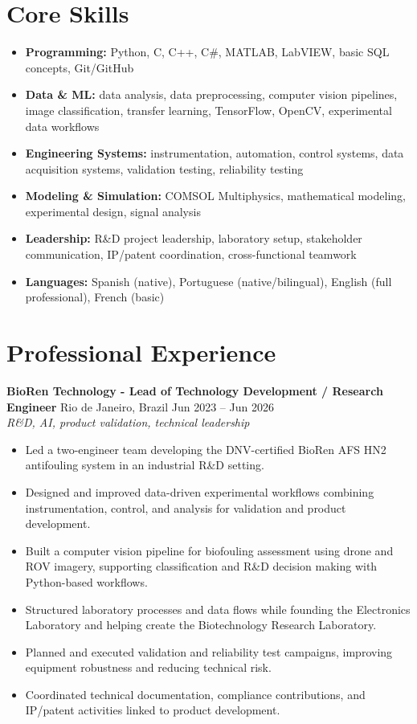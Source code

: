 \documentclass[11pt,a4paper]{article}
\newcommand{\job}[4]{\textbf{#1} \hfill #2\\\textit{#3}\\#4\vspace{6pt}}
\begin{document}
\section*{Core Skills}
\begin{itemize}[leftmargin=*,itemsep=2pt,topsep=2pt]
\item \textbf{Programming:} Python, C, C++, C\#, MATLAB, LabVIEW, basic SQL concepts, Git/GitHub
\item \textbf{Data \& ML:} data analysis, data preprocessing, computer vision pipelines, image classification, transfer learning, TensorFlow, OpenCV, experimental data workflows
\item \textbf{Engineering Systems:} instrumentation, automation, control systems, data acquisition systems, validation testing, reliability testing
\item \textbf{Modeling \& Simulation:} COMSOL Multiphysics, mathematical modeling, experimental design, signal analysis
\item \textbf{Leadership:} R\&D project leadership, laboratory setup, stakeholder communication, IP/patent coordination, cross-functional teamwork
\item \textbf{Languages:} Spanish (native), Portuguese (native/bilingual), English (full professional), French (basic)
\end{itemize}

\section*{Professional Experience}
\job{BioRen Technology - Lead of Technology Development / Research Engineer}{Rio de Janeiro, Brazil \hfill Jun 2023 -- Jun 2026}{R\&D, AI, product validation, technical leadership}{
\begin{itemize}[leftmargin=*,itemsep=2pt,topsep=2pt]
\item Led a two-engineer team developing the DNV-certified BioRen AFS HN2 antifouling system in an industrial R\&D setting.
\item Designed and improved data-driven experimental workflows combining instrumentation, control, and analysis for validation and product development.
\item Built a computer vision pipeline for biofouling assessment using drone and ROV imagery, supporting classification and R\&D decision making with Python-based workflows.
\item Structured laboratory processes and data flows while founding the Electronics Laboratory and helping create the Biotechnology Research Laboratory.
\item Planned and executed validation and reliability test campaigns, improving equipment robustness and reducing technical risk.
\item Coordinated technical documentation, compliance contributions, and IP/patent activities linked to product development.
\end{itemize}}
\end{document}
